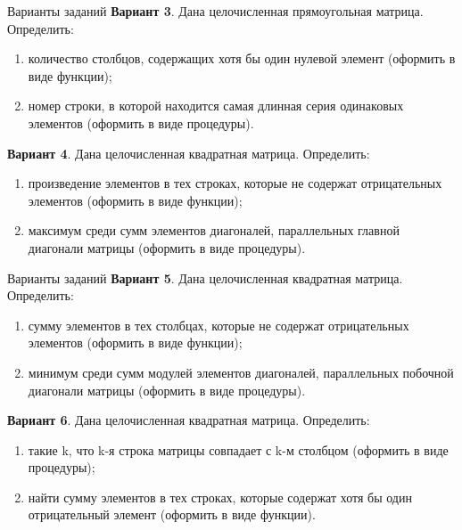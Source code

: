 \documentclass{beamer}
\begin{document}
\begin{frame}{Варианты заданий}
\textbf{Вариант 3}. Дана целочисленная прямоугольная матрица. Определить:
\begin{enumerate}
\item количество столбцов, содержащих хотя бы один нулевой элемент (оформить в виде функции);
\item номер строки, в которой находится самая длинная серия одинаковых элементов (оформить в виде процедуры).
\end{enumerate}
\textbf{Вариант 4}. Дана целочисленная квадратная матрица. Определить:
\begin{enumerate}
\item произведение элементов в тех строках, которые не содержат отрицательных элементов (оформить в виде функции); 
\item максимум среди сумм элементов диагоналей, параллельных главной диагонали матрицы (оформить в виде процедуры).
\end{enumerate}
\end{frame} 

\begin{frame}{Варианты заданий}
\textbf{Вариант 5}. Дана целочисленная квадратная матрица. Определить:
\begin{enumerate}
\item сумму элементов в тех столбцах, которые не содержат отрицательных элементов (оформить в виде функции);
\item минимум среди сумм модулей элементов диагоналей, параллельных побочной диагонали матрицы (оформить в виде процедуры).
\end{enumerate}
\textbf{Вариант 6}. Дана целочисленная квадратная матрица. Определить:
\begin{enumerate}
\item такие k, что k-я строка матрицы совпадает с k-м столбцом (оформить в виде процедуры); 
\item найти сумму элементов в тех строках, которые содержат хотя бы один отрицательный элемент (оформить в виде функции).
\end{enumerate}
\end{frame}
\end{document}
